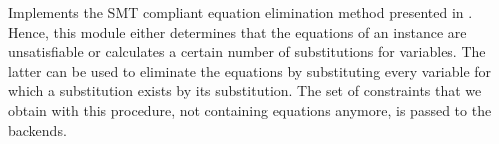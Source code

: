Implements the SMT compliant equation elimination method presented in \cite{TO-DO}.
Hence, this module either determines that the equations of an instance are unsatisfiable
or calculates a certain number of substitutions for variables. The latter can be used to 
eliminate the equations by substituting every variable for which a substitution exists
by its substitution. The set of constraints that we obtain with this procedure, not containing equations 
anymore, is passed to the backends.